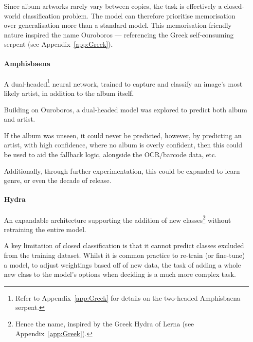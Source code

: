                 Since album artworks rarely vary between copies, the task is effectively a closed-world classification problem. The model can therefore prioritise memorisation over generalisation more than a standard model. This memorisation-friendly nature inspired the name Ouroboros — referencing the Greek self-consuming serpent (see Appendix~\ref{app:Greek}).
    
                \paragraph{Amphisbaena} A dual-headed\footnote{Refer to Appendix~\ref{app:Greek} for details on the two-headed Amphisbaena serpent.} neural network, trained to capture and classify an image's most likely artist, in addition to the album itself.
    
                Building on Ouroboros, a dual-headed model was explored to predict both album and artist.
    
                If the album was unseen, it could never be predicted, however, by predicting an artist, with high confidence, where no album is overly confident, then this could be used to aid the fallback logic, alongside the OCR/barcode data, etc.
    
                Additionally, through further experimentation, this could be expanded to learn genre, or even the decade of release.
    
                \paragraph{Hydra} An expandable architecture supporting the addition of new classes\footnote{Hence the name, inspired by the Greek Hydra of Lerna (see Appendix~\ref{app:Greek}).} without retraining the entire model.
                
    
                A key limitation of closed classification is that it cannot predict classes excluded from the training dataset. Whilst it is common practice to re-train (or fine-tune) a model, to adjust weightings based off of new data, the task of adding a whole new class to the model's options when deciding is a much more complex task.
    

